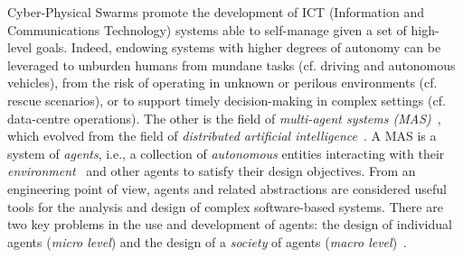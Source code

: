 


\newcommand{\revision}[1]{{#1}}



%
%
%
Cyber-Physical Swarms promote the development of ICT \revision{(Information and Communications Technology)} systems
able to self-manage given a set of high-level goals.
%
Indeed, endowing systems with higher degrees of autonomy can be leveraged to
 unburden humans from mundane tasks (cf. driving and autonomous vehicles),
 from the risk of operating in unknown or perilous environments
 (cf. rescue scenarios),
 or to support timely decision-making in complex settings
 (cf. data-centre operations).
%
The other is the field of \emph{multi-agent systems (MAS)}~\cite{wooldridge2009mas}, which evolved from the field of \emph{distributed artificial intelligence}~\cite{ferber1999mas-dai}.
%
A MAS is a system of \emph{agents}, i.e., a collection of \emph{autonomous} entities interacting with their \emph{environment}~\cite{DBLP:journals/aamas/WeynsOO07} and other agents to satisfy their design objectives.
%
From an engineering point of view, agents and related abstractions are considered useful tools for the analysis
and design of complex software-based systems.
%
There are two key problems in the use and development of agents: the design of individual agents (\emph{micro level}) and the design of a \emph{society} of agents (\emph{macro level})~\cite{wooldridge2009mas}.

